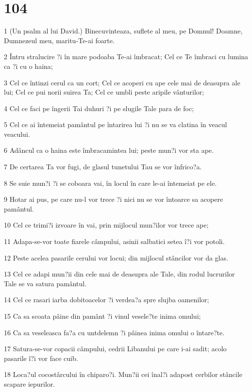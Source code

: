 \chapter{104}

\par 1 (Un psalm al lui David.) Binecuvinteaza, suflete al meu, pe Domnul! Doamne, Dumnezeul meu, maritu-Te-ai foarte.
\par 2 Întru stralucire ?i în mare podoaba Te-ai îmbracat; Cel ce Te îmbraci cu lumina ca ?i cu o haina;
\par 3 Cel ce întinzi cerul ca un cort; Cel ce acoperi cu ape cele mai de deasupra ale lui; Cel ce pui norii suirea Ta; Cel ce umbli peste aripile vânturilor;
\par 4 Cel ce faci pe îngerii Tai duhuri ?i pe slugile Tale para de foc;
\par 5 Cel ce ai întemeiat pamântul pe întarirea lui ?i nu se va clatina în veacul veacului.
\par 6 Adâncul ca o haina este îmbracamintea lui; peste mun?i vor sta ape.
\par 7 De certarea Ta vor fugi, de glasul tunetului Tau se vor înfrico?a.
\par 8 Se suie mun?i ?i se coboara vai, în locul în care le-ai întemeiat pe ele.
\par 9 Hotar ai pus, pe care nu-l vor trece ?i nici nu se vor întoarce sa acopere pamântul.
\par 10 Cel ce trimi?i izvoare în vai, prin mijlocul mun?ilor vor trece ape;
\par 11 Adapa-se-vor toate fiarele câmpului, asinii salbatici setea î?i vor potoli.
\par 12 Peste acelea pasarile cerului vor locui; din mijlocul stâncilor vor da glas.
\par 13 Cel ce adapi mun?ii din cele mai de deasupra ale Tale, din rodul lucrurilor Tale se va satura pamântul.
\par 14 Cel ce rasari iarba dobitoacelor ?i verdea?a spre slujba oamenilor;
\par 15 Ca sa scoata pâine din pamânt ?i vinul vesele?te inima omului;
\par 16 Ca sa veseleasca fa?a cu untdelemn ?i pâinea inima omului o întare?te.
\par 17 Satura-se-vor copacii câmpului, cedrii Libanului pe care i-ai sadit; acolo pasarile î?i vor face cuib.
\par 18 Loca?ul cocostârcului în chiparo?i. Mun?ii cei înal?i adapost cerbilor stâncile scapare iepurilor.
